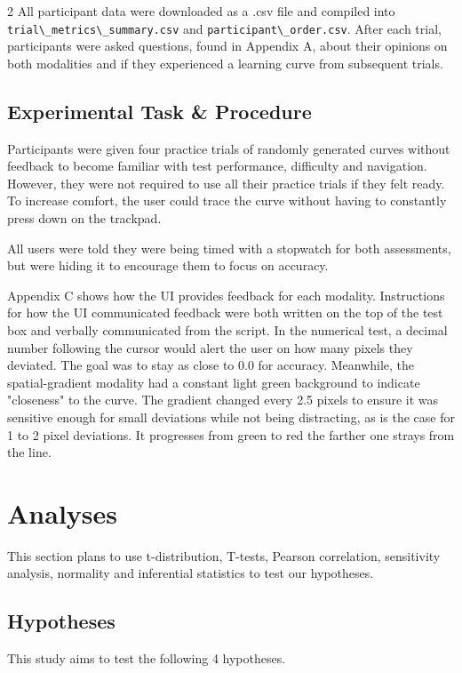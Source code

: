 \documentclass[a4paper,12pt]{article}
\begin{document}
\begin{multicols}{2}
All participant data were downloaded as a .csv file and compiled into \verb|trial\_metrics\_summary.csv| and \verb|participant\_order.csv|. After each trial, participants were asked questions, found in Appendix A, about their opinions on both modalities and if they experienced a learning curve from subsequent trials.

\subsection{Experimental Task \& Procedure}
\vspace{-5pt}
Participants were given four practice trials of randomly generated curves without feedback\cite{trials} to become familiar with test performance, difficulty and navigation. However, they were not required to use all their practice trials if they felt ready. To increase comfort, the user could trace the curve without having to constantly press down on the trackpad.

All users were told they were being timed with a stopwatch for both assessments, but were hiding it to encourage them to focus on accuracy.

Appendix C shows how the UI provides feedback for each modality. Instructions for how the UI communicated feedback were both written on the top of the test box and verbally communicated from the script. In the numerical test, a decimal number following the cursor would alert the user on how many pixels they deviated. The goal was to stay as close to 0.0 for accuracy. Meanwhile, the spatial-gradient modality had a constant light green background to indicate "closeness" to the curve. The gradient changed every 2.5 pixels to ensure it was sensitive enough for small deviations while not being distracting, as is the case for 1 to 2 pixel deviations\cite{gradiant}. It progresses from green to red the farther one strays from the line.  
 


\section{Analyses} 
This section plans to use t-distribution, T-tests, Pearson correlation, sensitivity analysis, normality and inferential statistics to test our hypotheses. \vspace{-10pt}
\subsection{Hypotheses}
This study aims to test the following 4 hypotheses.


\end{multicols}
\end{document}
